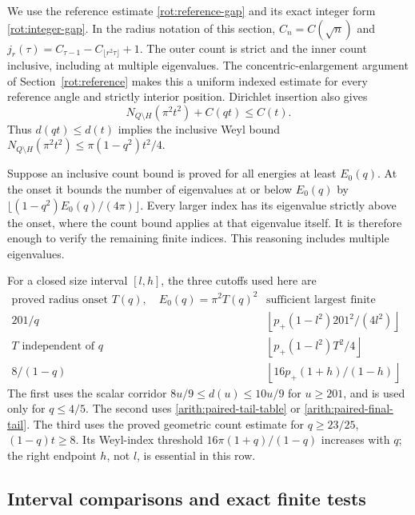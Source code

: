 \documentclass[11pt,reqno]{amsart}
\numberwithin{equation}{section}
\begin{document}
We use the reference estimate \eqref{rot:reference-gap} and its exact
integer form \eqref{rot:integer-gap}.  In the radius notation of this
section, $C_n=C(\sqrt n)$ and
$j_r(\tau)=C_{\tau-1}-C_{\lfloor r^2\tau\rfloor}+1$.
The outer count is strict and the inner count inclusive, including at
multiple eigenvalues.  The concentric-enlargement argument of
Section~\ref{rot:reference} makes this a uniform indexed estimate for
every reference angle and strictly interior position.
Dirichlet insertion also gives
\begin{equation}\label{arith:insertion}
 N_{Q\setminus H}(\pi^2t^2)+C(qt)\le C(t).
\end{equation}
Thus $d(qt)\le d(t)$ implies the inclusive Weyl bound
$N_{Q\setminus H}(\pi^2t^2)\le\pi(1-q^2)t^2/4$.

Suppose an inclusive count bound is proved for all energies at least
$E_0(q)$.  At the onset it bounds the number of eigenvalues at or below
$E_0(q)$ by $\lfloor(1-q^2)E_0(q)/(4\pi)\rfloor$.
Every larger index has its eigenvalue strictly above the onset, where
the count bound applies at that eigenvalue itself.  It is therefore
enough to verify the remaining finite indices.  This reasoning includes
multiple eigenvalues.

For a closed size interval $[l,h]$, the three cutoffs used here are
\begin{equation}\label{arith:cutoffs}
\begin{array}{c|c}
 \text{proved radius onset }T(q),\quad E_0(q)=\pi^2T(q)^2
      &\text{sufficient largest finite index}\\ \hline
 201/q&\left\lfloor p_+(1-l^2)201^2/(4l^2)\right\rfloor\\
 T\text{ independent of }q&\left\lfloor p_+(1-l^2)T^2/4\right\rfloor\\
 8/(1-q)&\left\lfloor16p_+(1+h)/(1-h)\right\rfloor
\end{array}
\end{equation}
The first uses the scalar corridor $8u/9\le d(u)\le10u/9$ for
$u\ge201$, and is used only for $q\le4/5$.
The second uses \eqref{arith:paired-tail-table} or
\eqref{arith:paired-final-tail}.  The third uses the proved geometric
count estimate for $q\ge23/25$, $(1-q)t\ge8$.
Its Weyl-index threshold $16\pi(1+q)/(1-q)$ increases with $q$;
the right endpoint $h$, not $l$, is essential in this row.

\subsection{Interval comparisons and exact finite tests}
\end{document}
